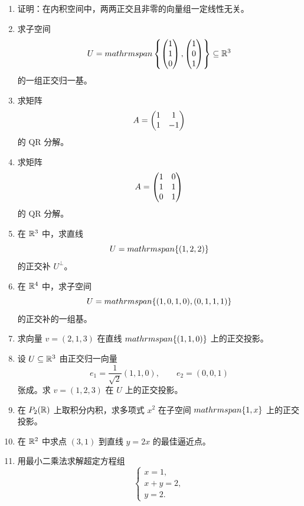 \begin{enumerate}[label=\textbf{5.\arabic*.}]
  \item \basic 证明：在内积空间中，两两正交且非零的向量组一定线性无关。

  \item \basic 求子空间
  \[
  U=\\mathrm{span}\left\{\begin{pmatrix} 1\\1\\0 \end{pmatrix},\begin{pmatrix} 1\\0\\1 \end{pmatrix}\right\}\subseteq \mathbb{R}^3
  \]
  的一组正交归一基。

  \item \basic 求矩阵
  \[
  A=\begin{pmatrix} 1&1\\1&-1 \end{pmatrix}
  \]
  的 QR 分解。

  \item \basic 求矩阵
  \[
  A=\begin{pmatrix} 1&0\\1&1\\0&1 \end{pmatrix}
  \]
  的 QR 分解。

  \item \basic 在 $\mathbb{R}^3$ 中，求直线
  \[
  U=\\mathrm{span}\{(1,2,2)\}
  \]
  的正交补 $U^{\perp}$。

  \item \basic 在 $\mathbb{R}^4$ 中，求子空间
  \[
  U=\\mathrm{span}\{(1,0,1,0),(0,1,1,1)\}
  \]
  的正交补的一组基。

  \item \basic 求向量 $v=(2,1,3)$ 在直线 $\\mathrm{span}\{(1,1,0)\}$ 上的正交投影。

  \item \basic 设 $U\subseteq \mathbb{R}^3$ 由正交归一向量
  \[
  e_1=\frac{1}{\sqrt2}(1,1,0),\qquad e_2=(0,0,1)
  \]
  张成。求 $v=(1,2,3)$ 在 $U$ 上的正交投影。

  \item \basic 在 $P_2(\mathbb{R})$ 上取积分内积，求多项式 $x^2$ 在子空间 $\\mathrm{span}\{1,x\}$ 上的正交投影。

  \item \basic 在 $\mathbb{R}^2$ 中求点 $(3,1)$ 到直线 $y=2x$ 的最佳逼近点。

  \item \basic 用最小二乘法求解超定方程组
  \[
  \begin{cases}
  x=1,\\
  x+y=2,\\
  y=2.
  \end{cases}
  \]


\end{enumerate}
